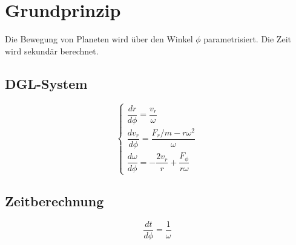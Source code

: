 \section{Grundprinzip}
Die Bewegung von Planeten wird über den Winkel $\phi$ parametrisiert. Die Zeit wird sekundär berechnet.

\subsection{DGL-System}
\[
\begin{cases}
\dfrac{dr}{d\phi} = \dfrac{v_r}{\omega} \\
\dfrac{dv_r}{d\phi} = \dfrac{F_r/m - r\omega^2}{\omega} \\
\dfrac{d\omega}{d\phi} = -\dfrac{2v_r}{r} + \dfrac{F_\phi}{r\omega}
\end{cases}
\]

\subsection{Zeitberechnung}
\[
\frac{dt}{d\phi} = \frac{1}{\omega}
\]